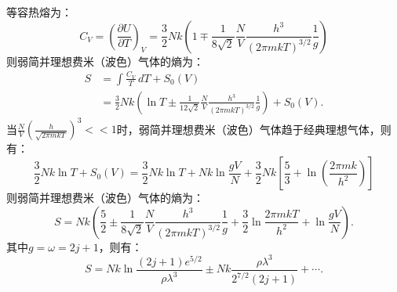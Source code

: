 \documentclass[reqno,a4paper,12pt]{amsart}
\begin{document}
\begin{tcolorbox}[breakable, colback = black!5!white, colframe = black]
\[\]
等容热熔为：
\[
	C_V = \left( \frac{\partial U}{\partial T} \right)_V = \frac{3}{2}Nk \left( 1 \mp \frac{1}{8\sqrt{2}}\frac{N}{V}\frac{h^3}{(2\pi mkT)^{3/2}} \frac{1}{g} \right)
\]
则弱简并理想费米（波色）气体的熵为：
\begin{align*}
	S &= \int \frac{C_V}{T}\,dT + S_0(V) \\
	&= \frac{3}{2}Nk\left( \ln T \pm \frac{1}{12\sqrt{2}} \frac{N}{V} \frac{h^3}{(2\pi mkT)^{3/2}} \frac{1}{g} \right) + S_0(V).
\end{align*}
当$\frac{N}{V}\left( \frac{h}{\sqrt{2\pi mkT}} \right)^3 << 1$时，弱简并理想费米（波色）气体趋于经典理想气体，则有：
\[
	\frac{3}{2}Nk\ln T + S_0(V) = \frac{3}{2}Nk\ln T + Nk\ln \frac{gV}{N} + \frac{3}{2}Nk \left[ \frac{5}{3} + \ln\left( \frac{2\pi mk}{h^2} \right) \right]
\]
则弱简并理想费米（波色）气体的熵为：
\[
	S = Nk\left( \frac{5}{2} \pm \frac{1}{8\sqrt{2}}\frac{N}{V}\frac{h^3}{(2\pi mkT)^{3/2}}\frac{1}{g} + \frac{3}{2}\ln \frac{2\pi mkT}{h^2} + \ln \frac{gV}{N} \right).
\]
其中$g = \omega = 2j+1$，则有：
\[
	S = Nk\ln \frac{(2j+1)e^{5/2}}{\rho\lambda^3} \pm Nk \frac{\rho\lambda^3}{2^{7/2}(2j+1)} + \cdots.
\]
\end{tcolorbox}
\end{document}
